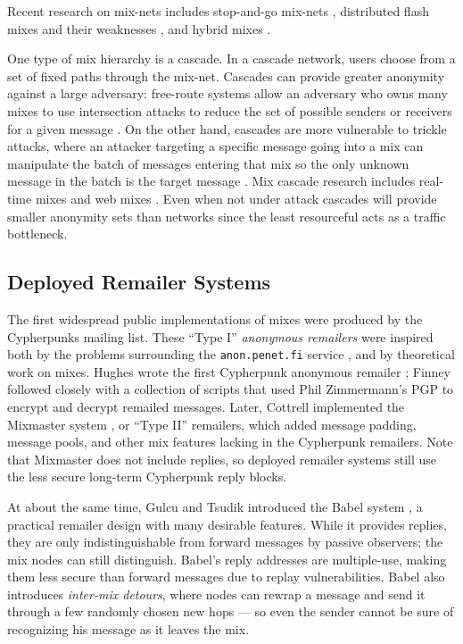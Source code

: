 \documentclass[11pt]{IEEEtran}
\begin{document}
Recent research on mix-nets includes stop-and-go mix-nets
\cite{kesdogan}, distributed flash mixes \cite{flash-mix} and their
weaknesses \cite{desmedt}\cite{mitkuro}, and hybrid mixes \cite{hybrid-mix}.

One type of mix hierarchy is a cascade.
In a cascade network, users choose from a set of fixed paths through
the mix-net.
Cascades can provide greater anonymity against a large adversary:
free-route systems allow an adversary who owns many mixes to use
intersection attacks to reduce the set of possible senders or receivers
for a given
message \cite{disad-free-routes}. On the other hand, cascades are more
vulnerable \cite{batching-taxonomy} to trickle attacks, where an attacker
targeting a specific message going into a mix can manipulate the batch
of messages entering that mix so the only unknown message in the batch
is the target message \cite{mixmaster-attacks}\cite{babel}.
Mix cascade research includes real-time mixes \cite{realtime-mix} and
web mixes \cite{web-mix}. Even when not under attack cascades will
provide smaller anonymity sets than networks since the least
resourceful acts as a traffic bottleneck.

\subsection{Deployed Remailer Systems}

The first widespread public implementations of mixes were produced by the
Cypherpunks mailing list. These ``Type I'' \emph{anonymous remailers}
were inspired both by the problems surrounding the {\tt anon.penet.fi}
service \cite{helsingius}, and by theoretical work on mixes. Hughes wrote
the first Cypherpunk anonymous remailer \cite{remailer-history}; Finney
followed closely with a collection of scripts that used Phil Zimmermann's
PGP to encrypt and decrypt remailed messages. Later, Cottrell implemented
the Mixmaster system \cite{mixmaster}\cite{mixmaster-spec}, or ``Type II'' remailers,
which added message padding, message pools, and other mix features lacking
in the Cypherpunk remailers. Note that Mixmaster does not include replies,
so deployed remailer systems still use the less secure
long-term Cypherpunk reply blocks.

At about the same time, Gulcu and Tsudik introduced the Babel
system \cite{babel}, a practical remailer design with many desirable
features. While it provides replies, they are only indistinguishable
from forward messages by passive observers; the mix nodes can still
distinguish. Babel's reply addresses are multiple-use, making them less
secure than forward messages due to replay vulnerabilities. Babel also
introduces \emph{inter-mix detours}, where nodes can rewrap a message
and send it through a few randomly chosen new hops --- so even the sender
cannot be sure of recognizing his message as it leaves the mix.
\end{document}
